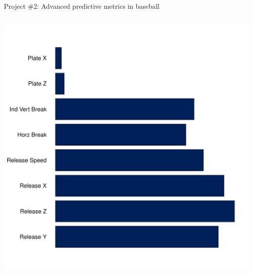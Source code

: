 \documentclass[handout]{beamer}
\begin{document}
\begin{frame}{Project \#2: Advanced predictive metrics in baseball}
\begin{columns}
\begin{column}{0.5\textwidth}
      \includegraphics[width = \textwidth]{images/feature_reliability.pdf}
    \end{column}
  \end{columns}
\end{frame}
\end{document}
